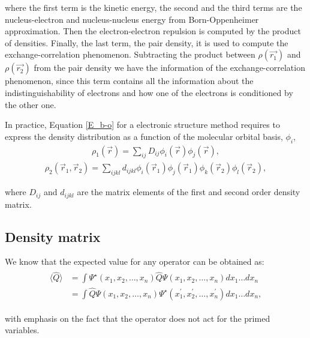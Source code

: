 \noindent where the first term is the kinetic energy, the second and the third terms are
the nucleus-electron and nucleus-nucleus energy from Born-Oppenheimer
approximation. Then the electron-electron repulsion is computed by the product
of densities. Finally, the last term, the pair density, it is used to compute
the exchange-correlation phenomenon.
Subtracting the product between $\rho(\vec{r_1})$ and $\rho(\vec{r_2})$
from the pair density we have the
information of the exchange-correlation phenomenon, since this term
contains all the information about the 
indistinguishability of electrons and how one of the electrons is
conditioned by the other one.

In practice, Equation \ref{E_b-o} for a electronic structure
method requires to
express the density distribution as a function of the
molecular orbital basis, $\phi_i$,
%
\begin{align}
\rho_1 (\vec{r}) = \sum_{ij} D_{ij}\phi_{i}(\vec{r})\phi_{j}(\vec{r}),
\end{align}
\begin{align}
\rho_2 (\vec{r}_1, \vec{r}_2) = \sum_{ijkl}d_{ijkl}\phi_{i}(\vec{r}_1) \phi_{j}(\vec{r}_1)
\phi_{k}(\vec{r}_2)\phi_{l}(\vec{r}_2),
\end{align}

\noindent where $D_{ij}$ and $d_{ijkl}$ are the matrix elements
of the first and second order density matrix.

\subsection{Density matrix}

We know that the expected value for any operator can be obtained as:
%
\begin{align}
	\begin{split}
\langle \widehat{Q} \rangle & = \int\Psi^{\star}(x_{1},x_{2},\ldots,x_{n}) \widehat{Q}
\Psi(x_{1},x_{2},\ldots,x_{n}) dx_{1}\ldots dx_{n} \\ 
	& = \int\widehat{Q}\Psi(x_{1},x_{2},\ldots,x_{n}) \Psi^{\star}(x^{\prime}_{1},x^{\prime}_{2},\ldots,x^{\prime}_{n})
	dx_{1}\ldots dx_{n} ,
	\end{split}
\end{align}

\noindent with emphasis on the fact that
the operator does not act for the primed variables.

